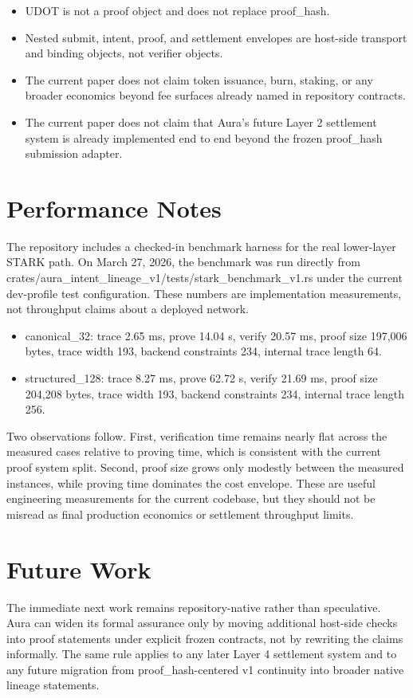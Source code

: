 \documentclass[conference]{IEEEtran}
\begin{document}
\begin{itemize}
\item UDOT is not a proof object and does not replace proof\_hash.
\item Nested submit, intent, proof, and settlement envelopes are host-side transport and binding objects, not verifier objects.
\item The current paper does not claim token issuance, burn, staking, or any broader economics beyond fee surfaces already named in repository contracts.
\item The current paper does not claim that Aura's future Layer 2 settlement system is already implemented end to end beyond the frozen proof\_hash submission adapter.
\end{itemize}
\section{Performance Notes}
The repository includes a checked-in benchmark harness for the real lower-layer STARK path. On March 27, 2026, the benchmark was run directly from crates/aura\_intent\_lineage\_v1/tests/stark\_benchmark\_v1.rs under the current dev-profile test configuration. These numbers are implementation measurements, not throughput claims about a deployed network.

\begin{itemize}
\item canonical\_32: trace 2.65 ms, prove 14.04 s, verify 20.57 ms, proof size 197,006 bytes, trace width 193, backend constraints 234, internal trace length 64.
\item structured\_128: trace 8.27 ms, prove 62.72 s, verify 21.69 ms, proof size 204,208 bytes, trace width 193, backend constraints 234, internal trace length 256.
\end{itemize}
Two observations follow. First, verification time remains nearly flat across the measured cases relative to proving time, which is consistent with the current proof system split. Second, proof size grows only modestly between the measured instances, while proving time dominates the cost envelope. These are useful engineering measurements for the current codebase, but they should not be misread as final production economics or settlement throughput limits.

\section{Future Work}
The immediate next work remains repository-native rather than speculative. Aura can widen its formal assurance only by moving additional host-side checks into proof statements under explicit frozen contracts, not by rewriting the claims informally. The same rule applies to any later Layer 4 settlement system and to any future migration from proof\_hash-centered v1 continuity into broader native lineage statements.
\end{document}
